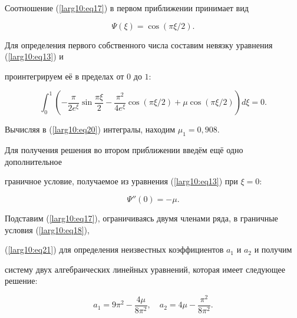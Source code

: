 Соотношение (\ref{larg10:eq17}) в первом приближении принимает вид

\begin{equation}

\label{larg10:eq19}

\Psi (\xi )=\cos ({\pi }\xi/2).

\end{equation}



Для определения первого собственного числа составим невязку уравнения (\ref{larg10:eq13}) и

проинтегрируем её в пределах от $0$ до $1$:

\begin{equation}

\label{larg10:eq20}

\int_0^1 \left( -\frac{\pi }{2e^\xi }\sin \frac{\pi \xi

}{2}-\frac{\pi ^2}{4e^\xi }\cos ({\pi \xi }/{2})+\mu \cos ({\pi \xi }/{2}) \right) d\xi =0.

\end{equation}

Вычисляя в (\ref{larg10:eq20}) интегралы, находим $\mu _1 =0,908$.



Для получения решения во втором приближении введём ещё одно дополнительное

граничное условие, получаемое из уравнения (\ref{larg10:eq13}) при $\xi =0$:

\begin{equation}

\label{larg10:eq21}

\Psi''(0)=-\mu .

\end{equation}

Подставим (\ref{larg10:eq17}), ограничиваясь двумя членами ряда, в граничные условия (\ref{larg10:eq18}),

(\ref{larg10:eq21}) для определения неизвестных коэффициентов $a_1 $ и $a_2 $ и получим

систему двух алгебраических линейных уравнений, которая имеет следующее решение:

\begin{equation}

\label{larg10:eq22}

a_1 = 9 \pi^2 - \frac{4\mu}{8 \pi ^2}, \quad

a_2 = 4 \mu - \frac{\pi ^2}{8 \pi^2}.

\end{equation}


